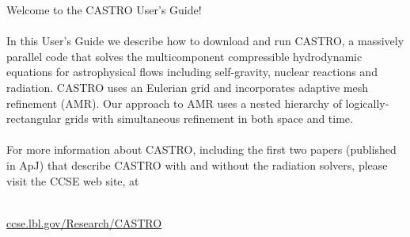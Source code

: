 Welcome to the CASTRO User's Guide!\\ \\

In this User's Guide we describe how to download and run CASTRO, a massively parallel code 
that solves the multicomponent compressible hydrodynamic equations for 
astrophysical flows including self-gravity, nuclear reactions and radiation.
CASTRO uses an Eulerian grid and incorporates adaptive mesh refinement (AMR).
Our approach to AMR uses a nested hierarchy of logically-rectangular grids with
simultaneous refinement in both space and time. \\  \\

For more information about CASTRO, including the first two papers (published in ApJ) that describe
CASTRO with and without the radiation solvers, please visit the CCSE web site, at \\ \\

\begin{center}
\url{ccse.lbl.gov/Research/CASTRO}
\end{center}
